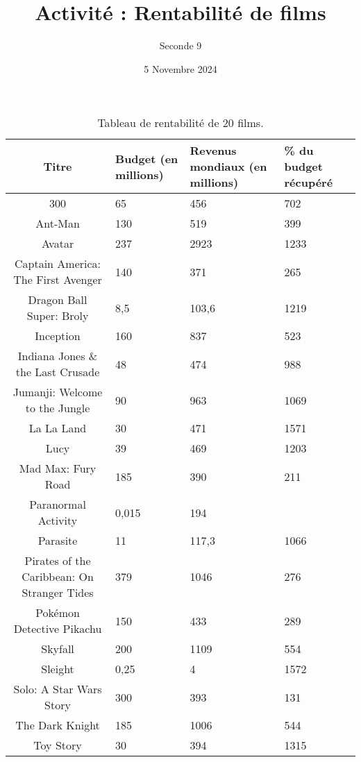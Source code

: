 \documentclass{article}
\title{Activité : Rentabilité de films}
\author{Seconde 9}
\date{5 Novembre 2024}
\begin{document}
\maketitle

\begin{table}[]
    \centering
    \begin{tabular}{|c|p{2cm}|p{2cm}|p{2cm}|}
    \hline
    Titre & Budget (en millions) & Revenus mondiaux (en millions) & \% du budget récupéré \\ \hline
    300 & 65 & 456 & 702 \\ \hline
    Ant-Man & 130 & 519 & 399 \\ \hline
    Avatar & 237 & 2923 & 1233 \\ \hline
    Captain America: The First Avenger & 140 & 371 & 265 \\ \hline
    Dragon Ball Super: Broly & 8,5 & 103,6 & 1219 \\ \hline
    Inception & 160 & 837 & 523 \\ \hline
    Indiana Jones \& the Last Crusade & 48 & 474 & 988 \\ \hline
    Jumanji: Welcome to the Jungle & 90 & 963 & 1069 \\ \hline
    La La Land & 30 & 471 & 1571 \\ \hline
    Lucy & 39 & 469 & 1203 \\ \hline
    Mad Max: Fury Road & 185 & 390 & 211 \\ \hline
    Paranormal Activity & 0,015 & 194 & \\ \hline
    Parasite & 11 & 117,3 & 1066 \\ \hline
    Pirates of the Caribbean: On Stranger Tides & 379 & 1046 & 276 \\ \hline
    Pokémon Detective Pikachu & 150 & 433 & 289 \\ \hline
    Skyfall & 200 & 1109 & 554 \\ \hline
    Sleight & 0,25 & 4 & 1572 \\ \hline
    Solo: A Star Wars Story & 300 & 393 & 131 \\ \hline
    The Dark Knight & 185 & 1006 & 544 \\ \hline
    Toy Story & 30 & 394 & 1315 \\ \hline
    \end{tabular}
    \caption{Tableau de rentabilité de 20 films.
    }
    \label{tab:my-table}
    \end{table}
\end{document}
